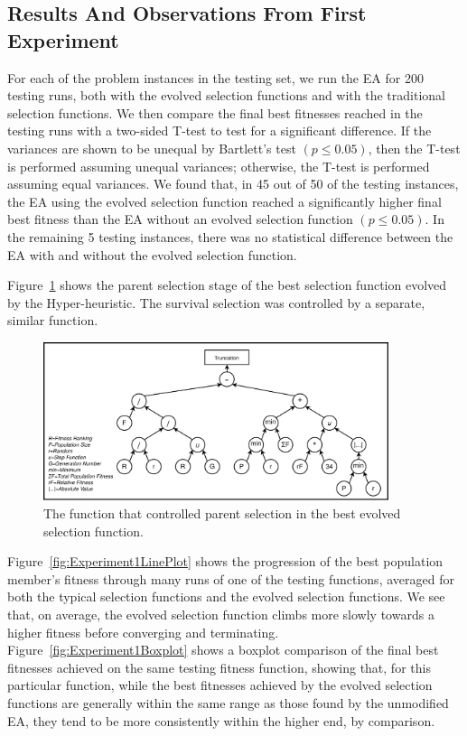 \documentclass[times,12pt,titlepage]{mstogs}
\begin{document}
\begin{ThesisBody}
\section{Results And Observations From First Experiment}
\label{firstExperimentResults}

For each of the problem instances in the testing set, we run the EA for 200 testing runs, both with the evolved selection functions and with the traditional selection functions. We then compare the final best fitnesses reached in the testing runs with a two-sided T-test to test for a significant difference. If the variances are shown to be unequal by Bartlett's test $(p \leq 0.05)$, then the T-test is performed assuming unequal variances; otherwise, the T-test is performed assuming equal variances. We found that, in 45 out of 50 of the testing instances, the EA using the evolved selection function reached a significantly higher final best fitness than the EA without an evolved selection function $(p \leq 0.05)$. In the remaining 5 testing instances, there was no statistical difference between the EA with and without the evolved selection function.

Figure~\ref{fig:experiment1Result} shows the parent selection stage of the best selection function evolved by the Hyper-heuristic. The survival selection was controlled by a separate, similar function.

\begin{figure}
    \centering
    \includegraphics[width=0.9\textwidth]{experiment1Result}
    \caption{The function that controlled parent selection in the best evolved selection function.}
    \label{fig:experiment1Result}
\end{figure}

Figure~\ref{fig:Experiment1LinePlot} shows the progression of the best population member's fitness through many runs of one of the testing functions, averaged for both the typical selection functions and the evolved selection functions. We see that, on average, the evolved selection function climbs more slowly towards a higher fitness before converging and terminating. Figure~\ref{fig:Experiment1Boxplot} shows a boxplot comparison of the final best fitnesses achieved on the same testing fitness function, showing that, for this particular function, while the best fitnesses achieved by the evolved selection functions are generally within the same range as those found by the unmodified EA, they tend to be more consistently within the higher end, by comparison.


\end{ThesisBody}
\end{document}
